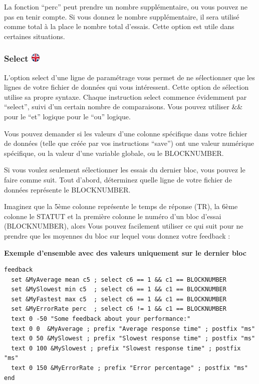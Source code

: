\documentclass[
]{book}
\begin{document}
La fonction ``perc'' peut prendre un nombre supplémentaire, ou vous
pouvez ne pas en tenir compte. Si vous donnez le nombre supplémentaire,
il sera utilisé comme total à la place le nombre total d'essais. Cette
option est utile dans certaines situations.

\hypertarget{select-ukflag}{%
\subsubsection[Select ]{\texorpdfstring{Select
\href{https://www.psytoolkit.org/doc3.1.0/feedback.html\#_select}{\protect\includegraphics{img/ukflag.png}}}{Select ukflag}}\label{select-ukflag}}

L'option select d'une ligne de paramétrage vous permet de ne
sélectionner que les lignes de votre fichier de données qui vous
intéressent. Cette option de sélection utilise sa propre syntaxe. Chaque
instruction select commence évidemment par ``select'', suivi d'un
certain nombre de comparaisons. Vous pouvez utiliser \&\& pour le ``et''
logique \textbar\textbar{} pour le ``ou'' logique.

Vous pouvez demander si les valeurs d'une colonne spécifique dans votre
fichier de données (telle que créée par vos instructions ``save'') ont
une valeur numérique spécifique, ou la valeur d'une variable globale, ou
le BLOCKNUMBER.

Si vous voulez seulement sélectionner les essais du dernier bloc, vous
pouvez le faire comme suit. Tout d'abord, déterminez quelle ligne de
votre fichier de données représente le BLOCKNUMBER.

Imaginez que la 5ème colonne représente le temps de réponse (TR), la
6ème colonne le STATUT et la première colonne le numéro d'un bloc
d'essai (BLOCKNUMBER), alors Vous pouvez facilement utiliser ce qui suit
pour ne prendre que les moyennes du bloc sur lequel vous donnez votre
feedback :

\textbf{Exemple d'ensemble avec des valeurs uniquement sur le dernier
bloc}

\begin{verbatim}
feedback
  set &MyAverage mean c5 ; select c6 == 1 && c1 == BLOCKNUMBER
  set &MySlowest min c5  ; select c6 == 1 && c1 == BLOCKNUMBER
  set &MyFastest max c5  ; select c6 == 1 && c1 == BLOCKNUMBER
  set &MyErrorRate perc  ; select c6 != 1 && c1 == BLOCKNUMBER
  text 0 -50 "Some feedback about your performance:"
  text 0 0  &MyAverage ; prefix "Average response time" ; postfix "ms"
  text 0 50 &MySlowest ; prefix "Slowest response time" ; postfix "ms"
  text 0 100 &MySlowest ; prefix "Slowest response time" ; postfix "ms"
  text 0 150 &MyErrorRate ; prefix "Error percentage" ; postfix "ms"
end
\end{verbatim}
\end{document}

